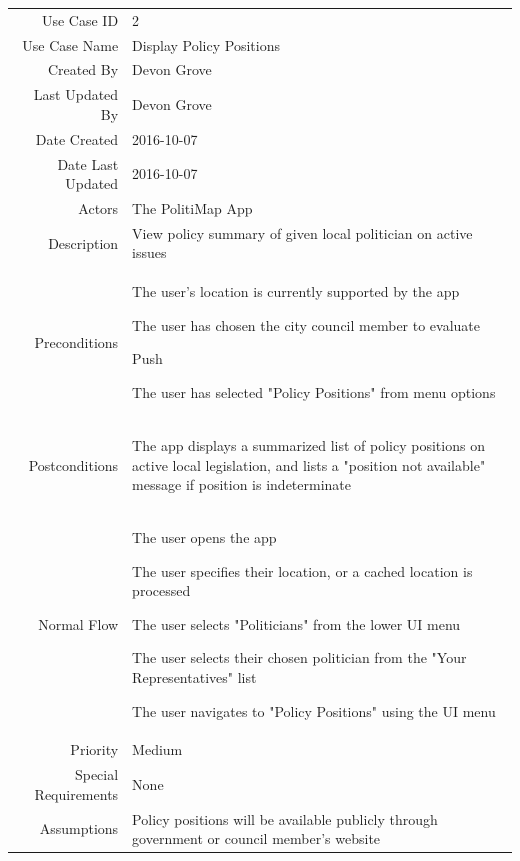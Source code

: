 \documentclass[12pt,oneside,letterpaper]{article}
\newenvironment{packed_enumerate}{
\begin{minipage}[t]{\linewidth}\begin{compactenum}[after=\strut]}
{\end{compactenum}\end{minipage}}
\begin{document}
\begin{longtable}{|r|p{3.8in}|}
\hline
Use Case ID & 2\\
  Use Case Name & Display Policy Positions\\
  Created By & Devon Grove\\
  Last Updated By & Devon Grove\\
  Date Created & 2016-10-07\\
  Date Last Updated& 2016-10-07\\
  Actors & The PolitiMap App\\
  Description & View policy summary of given local politician on active issues\\
  Preconditions &
  \begin{packed_enumerate}
  \item The user's location is currently supported by the app
  \item The user has chosen the city council member to evaluate
  \item Push
  \item The user has selected "Policy Positions" from menu options
  \end{packed_enumerate} \\
  Postconditions &
  \begin{packed_enumerate}
  \item The app displays a summarized list of policy positions on active local legislation, and
  	lists a "position not available" message if position is indeterminate
  \end{packed_enumerate} \\
  Normal Flow &
  \begin{packed_enumerate}
  \item The user opens the app
  \item The user specifies their location, or a cached location is processed
  \item The user selects "Politicians" from the lower UI menu
  \item The user selects their chosen politician from the "Your Representatives" list
  \item The user navigates to "Policy Positions" using the UI menu
  \end{packed_enumerate} \\
  Priority & Medium\\
  Special Requirements & None\\
  Assumptions & Policy positions will be available publicly through government or council member's website\\
\hline
\end{longtable}
\end{document}
